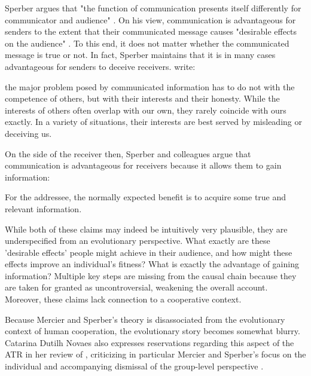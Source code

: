 Sperber argues that "the function of communication presents itself differently for communicator and audience" \citep[p.~411]{Sperber01}. On his view, communication is advantageous for senders to the extent that their communicated message causes "desirable effects on the audience" \citep[p.~406]{Sperber01}. To this end, it does not matter whether the communicated message is true or not. In fact, Sperber maintains that it is in many cases advantageous for senders to deceive receivers. \citet{Sperber10} write:
\begin{quoting}
    the major problem posed by communicated information has to do not with the
competence of others, but with their interests and their honesty. While the interests of others often overlap with our own, they rarely coincide with ours exactly. In a variety of situations, their interests are best served by misleading or deceiving us.
    \hfill \citep[p.~360]{Sperber10}
\end{quoting}
On the side of the receiver then, Sperber and colleagues argue that communication is advantageous for receivers because it allows them to gain information:
\begin{quoting}
    For the addressee, the normally expected benefit is to acquire some true and relevant information.
    \hfill \citep[p.~360]{Sperber10}
\end{quoting}

While both of these claims may indeed be intuitively very plausible, they are underspecified from an evolutionary perspective. What exactly are these 'desirable effects' people might achieve in their audience, and how might these effects improve an individual's fitness? What is exactly the advantage of gaining information? Multiple key steps are missing from the causal chain because they are taken for granted as uncontroversial, weakening the overall account. Moreover, these claims lack connection to a cooperative context.

Because Mercier and Sperber's theory is disassociated from the evolutionary context of human cooperation, the evolutionary story becomes somewhat blurry.
Catarina Dutilh Novaes also expresses reservations regarding this aspect of the ATR in her \citeyear{Novaes18} review of \citet{MS17}, criticizing in particular Mercier and Sperber's focus on the individual and accompanying dismissal of the group-level perspective \citep[\S 3.3]{Novaes18}.

